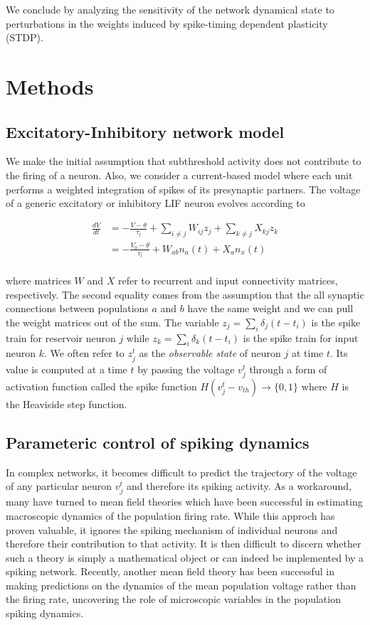 \documentclass{article} %
\begin{document}
We conclude by analyzing the sensitivity of the network dynamical state to perturbations in the weights induced by spike-timing dependent plasticity (STDP).

\section{Methods}


\subsection{Excitatory-Inhibitory network model}

We make the initial assumption that subthreshold activity does not contribute to the firing of a neuron. Also, we consider a current-based model where each unit performs a weighted integration of spikes of its presynaptic partners. The voltage of a generic excitatory or inhibitory LIF neuron evolves according to

\begin{align*}
\frac{dV}{dt} &= -\frac{V-\theta}{\tau_{l}} + \sum_{i \neq j}W_{ij}z_{j} + \sum_{k \neq j} X_{kj}z_{k}\\
&= -\frac{V_{0}-\theta}{\tau_{l}} + W_{ab}n_{a}(t) + X_{a}n_{x}(t)\\
\end{align*}

where matrices $W$ and $X$ refer to recurrent and input connectivity matrices, respectively. The second equality comes from the assumption that the all synaptic connections between populations $a$ and $b$ have the same weight and we can pull the weight matrices out of the sum. The variable $z_{j} = \sum_{i} \delta_{j} (t-t_{i})$ is the spike train for reservoir neuron $j$ while $z_{k} = \sum_{i} \delta_{k} (t-t_{i})$ is the spike train for input neuron $k$. We often refer to $z_{j}^{t}$ as the \emph{observable state} of neuron $j$ at time $t$. Its value is computed at a time $t$ by passing the voltage $v_{j}^{t}$ through a form of activation function called the spike function $H(v_{j}^{t} - v_{th}) \rightarrow \{0,1\}$ where $H$ is the Heaviside step function.

\subsection{Parameteric control of spiking dynamics}

In complex networks, it becomes difficult to predict the trajectory of the voltage of any particular neuron $v_{j}^{t}$ and therefore its spiking activity. As a workaround, many have turned to mean field theories which have been successful in estimating macroscopic dynamics of the population firing rate. While this approch has proven valuable, it ignores the spiking mechanism of individual neurons and therefore their contribution to that activity. It is then difficult to discern whether such a theory is simply a mathematical object or can indeed be implemented by a spiking network. Recently, another mean field theory has been successful in making predictions on the dynamics of the mean population voltage rather than the firing rate, uncovering the role of microscopic variables in the population spiking dynamics. 
\end{document}
